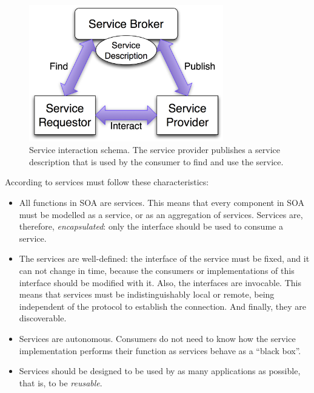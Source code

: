 \begin{figure}
\centering
\includegraphics[width=20pc]{gfx/soa/soaDiagram.jpg}
\caption{Service interaction schema. The service provider publishes a
  service description that is used by the consumer to find and use the
  service.} %
\label{fig:soadiagram}
\end{figure}

According to  \cite{Channabasavaiah2003migrating} services must follow these  characteristics:

\begin{itemize}
\item All functions in SOA are services. This means that every
  component in SOA must be modelled as a service, or as an aggregation of services. Services are, therefore, {\em encapsulated}: only the interface should be used to consume a service.
\item The services are well-defined: the interface of the service must be fixed, and it can not change in time, because the consumers or implementations of this interface should be modified with it. Also, the interfaces are invocable. This means that services must be
  indistinguishably local or remote, being independent of the protocol
  to establish the connection. And finally, they are discoverable. %
\item Services are autonomous. Consumers do not need to know how the service implementation performs their function as services behave as a ``black box''.
\item Services should be designed to be used by as many applications as possible, that is, to be {\em reusable}. 

\end{itemize}

